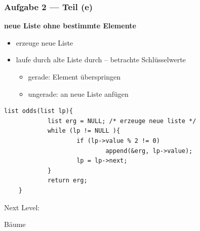 \documentclass{beamer}
\begin{document}
\begin{frame}[fragile] \frametitle{Aufgabe 2 --- Teil (e)}
	\textbf{neue Liste ohne bestimmte Elemente} \small
	\begin{itemize}
		\item erzeuge neue Liste
		\item laufe durch alte Liste durch -- betrachte Schlüsselwerte
		\begin{itemize} \footnotesize
			\item gerade: Element überspringen
			\item ungerade: an neue Liste anfügen
		\end{itemize}
	\end{itemize}
	
	\pause
	
	\begin{lstlisting}[style=notebook]
	list odds(list lp){
			list erg = NULL; /* erzeuge neue liste */		
			while (lp != NULL ){           
					if (lp->value % 2 != 0) 
							append(&erg, lp->value);
					lp = lp->next;              
			}
			return erg;
	}
	\end{lstlisting}
\end{frame}



\begin{frame}
	\bfseries \centering \Huge
	
	Next Level: 
	
	Bäume
\end{frame}


\end{document}
